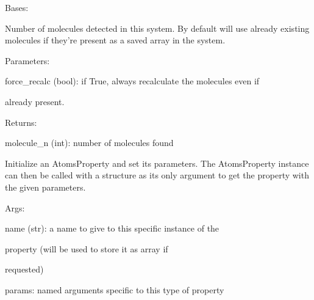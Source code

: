 \documentclass[letterpaper,10pt,english]{sphinxmanual}
\begin{document}

\begin{fulllineitems}
\label{doctree/soprano.properties.linkage.linkage:soprano.properties.linkage.linkage.MoleculeNumber}
Bases: {\hyperref[doctree/soprano.properties.atomsproperty:soprano.properties.atomsproperty.AtomsProperty]{\emph{}}}

Number of molecules detected in this system. By default will use already
existing molecules if they're present as a saved array in the system.

\begin{DUlineblock}{0em}
\item[] Parameters:
\item[]
\begin{DUlineblock}{\DUlineblockindent}
\item[] force\_recalc (bool): if True, always recalculate the molecules even if
\item[]
\begin{DUlineblock}{\DUlineblockindent}
\item[] already present.
\end{DUlineblock}
\end{DUlineblock}
\end{DUlineblock}

\begin{DUlineblock}{0em}
\item[] Returns:
\item[]
\begin{DUlineblock}{\DUlineblockindent}
\item[] molecule\_n (int): number of molecules found
\end{DUlineblock}
\end{DUlineblock}

Initialize an AtomsProperty and set its parameters.
The AtomsProperty instance can then be called with a structure as its
only argument to get the property with the given parameters.

\begin{DUlineblock}{0em}
\item[] Args:
\item[]
\begin{DUlineblock}{\DUlineblockindent}
\item[] name (str): a name to give to this specific instance of the
\item[]
\begin{DUlineblock}{\DUlineblockindent}
\item[] property (will be used to store it as array if
\item[] requested)
\end{DUlineblock}
\item[] params: named arguments specific to this type of property
\end{DUlineblock}
\end{DUlineblock}


\end{fulllineitems}
\end{document}
